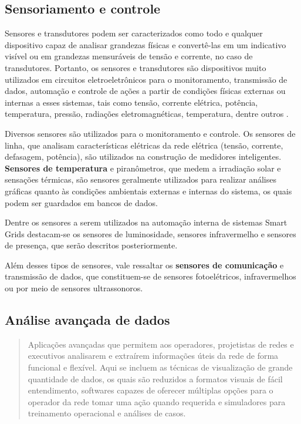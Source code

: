 \subsection{Sensoriamento e controle}
Sensores e transdutores podem ser caracterizados como todo e qualquer dispositivo capaz de analisar grandezas físicas e convertê-las em um indicativo visível ou em grandezas mensuráveis de tensão e corrente, no caso de transdutores. Portanto, os sensores e transdutores são dispositivos muito utilizados em circuitos eletroeletrônicos para o monitoramento, transmissão de dados, automação e controle de ações a partir de condições físicas externas ou internas a esses sistemas, tais como tensão, corrente elétrica, potência, temperatura, pressão, radiações eletromagnéticas, temperatura, dentre outros \cite{svoboda2008introduccao}.

Diversos sensores são utilizados para o monitoramento e controle. Os sensores de linha, que analisam características elétricas da rede elétrica (tensão, corrente, defasagem, potência), são utilizados na construção de medidores inteligentes. \textbf{Sensores de temperatura} e piranômetros, que medem a irradiação solar e sensações térmicas, são sensores geralmente utilizados para realizar análises gráficas quanto às condições ambientais externas e internas do sistema, os quais podem ser guardados em bancos de dados.

Dentre os sensores a serem utilizados na automação interna de sistemas Smart Grids destacam-se os sensores de luminosidade, sensores infravermelho e sensores de presença, que serão descritos posteriormente.

Além desses tipos de sensores, vale ressaltar os \textbf{sensores de comunicação} e transmissão de dados, que constituem-se de sensores fotoelétricos, infravermelhos ou por meio de sensores ultrassonoros.


\subsection{Análise avançada de dados}
\begin{quotation}
Aplicações avançadas que permitem aos operadores, projetistas de redes e executivos analisarem e extraírem informações úteis da rede de forma funcional e flexível. Aqui se incluem as técnicas de visualização de grande quantidade de dados, os quais são reduzidos a formatos visuais de fácil entendimento, softwares capazes de oferecer múltiplas opções para o operador da rede tomar uma ação quando requerida e simuladores para treinamento operacional e análises de casos.
\end{quotation}

